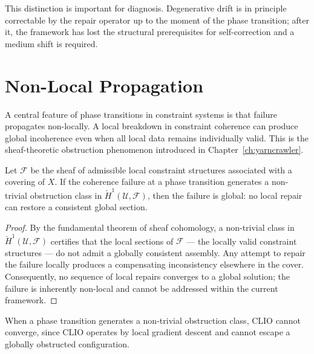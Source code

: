 \documentclass[11pt,openany]{book}
\begin{document}
\begin{remark}
This distinction is important for diagnosis.  Degenerative
drift is in principle correctable by the repair operator
up to the moment of the phase transition; after it, the
framework has lost the structural prerequisites for
self-correction and a medium shift is required.
\end{remark}

\section{Non-Local Propagation}
\label{sec:non-local}

A central feature of phase transitions in constraint systems
is that failure propagates non-locally.  A local breakdown
in constraint coherence can produce global incoherence even
when all local data remains individually valid.  This is
the sheaf-theoretic obstruction phenomenon introduced in
Chapter~\ref{ch:yarncrawler}.

\begin{theorem}
\label{thm:non-local-propagation}
Let $\mathcal{F}$ be the sheaf of admissible local
constraint structures associated with a covering of $X$.
If the coherence failure at a phase transition generates a
non-trivial obstruction class in $\check{H}^1(\mathcal{U},
\mathcal{F})$, then the failure is global: no local repair
can restore a consistent global section.
\end{theorem}

\begin{proof}
By the fundamental theorem of sheaf cohomology, a
non-trivial class in $\check{H}^1(\mathcal{U},
\mathcal{F})$ certifies that the local sections of
$\mathcal{F}$ --- the locally valid constraint structures
--- do not admit a globally consistent assembly.  Any
attempt to repair the failure locally produces a
compensating inconsistency elsewhere in the cover.
Consequently, no sequence of local repairs converges to a
global solution; the failure is inherently non-local and
cannot be addressed within the current framework.
\end{proof}

\begin{corollary}
\label{cor:no-local-fix}
When a phase transition generates a non-trivial
obstruction class, CLIO cannot converge, since CLIO
operates by local gradient descent and cannot escape a
globally obstructed configuration.
\end{corollary}
\end{document}

